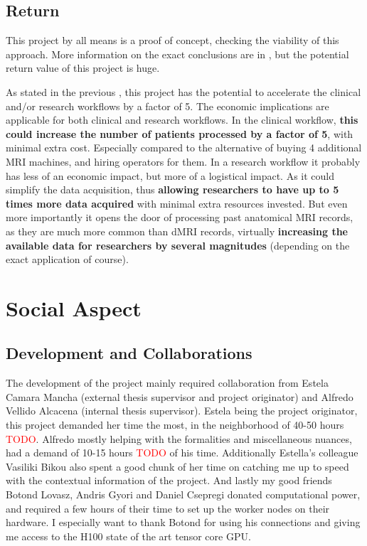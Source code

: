 \subsection{Return}

This project by all means is a proof of concept, checking the viability of this approach. More information on the exact conclusions are in , but the potential return value of this project is huge.\par
As stated in the previous , this project has the potential to accelerate the clinical and/or research workflows by a factor of 5. The economic implications are applicable for both clinical and research workflows. In the clinical workflow, \textbf{this could increase the number of patients processed by a factor of 5}, with minimal extra cost. Especially compared to the alternative of buying 4 additional MRI machines, and hiring operators for them. In a research workflow it probably has less of an economic impact, but more of a logistical impact. As it could simplify the data acquisition, thus \textbf{allowing researchers to have up to 5 times more data acquired} with minimal extra resources invested. But even more importantly it opens the door of processing past anatomical MRI records, as they are much more common than dMRI records, virtually \textbf{increasing the available data for researchers by several magnitudes} (depending on the exact application of course).

\section{Social Aspect}

\subsection{Development and Collaborations}

The development of the project mainly required collaboration from Estela Camara Mancha (external thesis supervisor and project originator) and Alfredo Vellido Alcacena (internal thesis supervisor). Estela being the project originator, this project demanded her time the most, in the neighborhood of 40-50 hours \textcolor{red}{TODO}. Alfredo mostly helping with the formalities and miscellaneous nuances, had a demand of 10-15 hours \textcolor{red}{TODO} of his time. Additionally Estella's colleague Vasiliki Bikou also spent a good chunk of her time on catching me up to speed with the contextual information of the project. And lastly my good friends Botond Lovasz, Andris Gyori and Daniel Csepregi donated computational power, and required a few hours of their time to set up the worker nodes on their hardware. I especially want to thank Botond for using his connections and giving me access to the H100 state of the art tensor core GPU.

